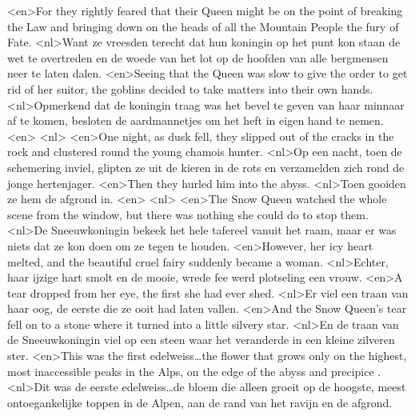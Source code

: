 <en>For they rightly feared that their Queen might be on the point of breaking the Law and bringing down on the heads of all the Mountain People the fury of Fate.
<nl>Want ze vreesden terecht dat hun koningin op het punt kon staan de wet te overtreden en de woede van  het lot op de hoofden van alle bergmensen neer te laten dalen.
<en>Seeing that the Queen was slow to give the order to get rid of her suitor, the goblins decided to take matters into their own hands.
<nl>Opmerkend dat de koningin traag was het bevel te geven van haar minnaar af te komen, besloten de aardmannetjes om het heft in eigen hand te nemen.
<en>
<nl>
<en>One night, as dusk fell, they slipped out of the cracks in the rock and clustered round the young chamois hunter.
<nl>Op een nacht, toen de schemering inviel, glipten ze uit de kieren in de rots en verzamelden zich rond de jonge hertenjager.
<en>Then they hurled him into the abyss.
<nl>Toen gooiden ze hem de afgrond in.
<en>
<nl>
<en>The Snow Queen watched the whole scene from the window, but there was nothing she could do to stop them.
<nl>De Sneeuwkoningin bekeek het hele tafereel vanuit het raam, maar er was niets dat ze kon doen om ze tegen te houden.
<en>However, her icy heart melted, and the beautiful cruel fairy suddenly became a woman.
<nl>Echter, haar ijzige hart smolt en de mooie, wrede fee werd plotseling een vrouw.
<en>A tear dropped from her eye, the first she had ever shed.
<nl>Er viel een traan van haar oog, de eerste die ze ooit had laten vallen.
<en>And the Snow Queen’s tear fell on to a stone where it turned into a little silvery star.
<nl>En de traan van de Sneeuwkoningin viel op een steen waar het veranderde in een kleine zilveren ster.
<en>This was the first edelweiss\ldots the flower that grows only on the highest, most inaccessible peaks in the Alps, on the edge of the abyss and precipice .
<nl>Dit was de eerste edelweiss\ldots de bloem die alleen groeit op de hoogste, meest ontoegankelijke toppen in de Alpen, aan de rand van het ravijn en de afgrond.
